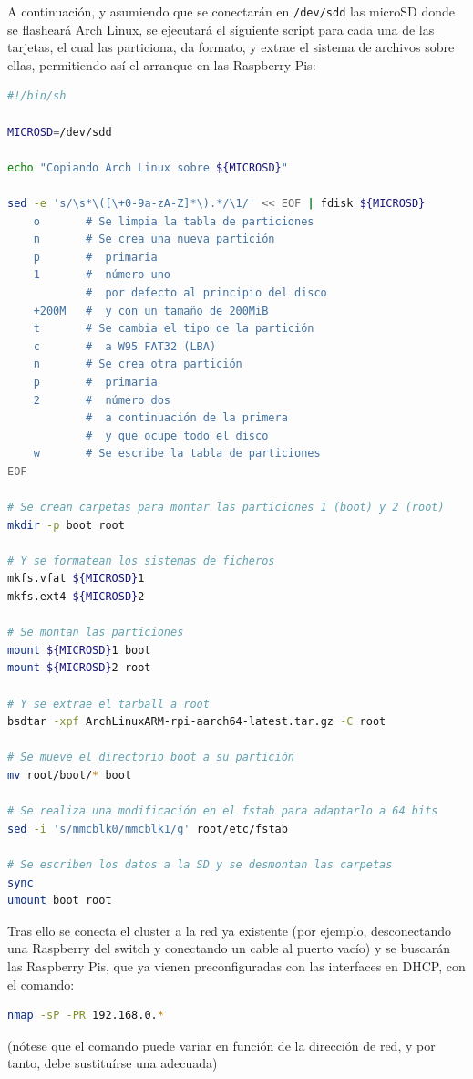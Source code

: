 A continuación, y asumiendo que se conectarán en \texttt{/dev/sdd} las microSD donde se flasheará Arch Linux, se ejecutará el siguiente script para cada una de las tarjetas, el cual las particiona, da formato, y extrae el sistema de archivos sobre ellas, permitiendo así el arranque en las Raspberry Pis:

\begin{lstlisting}[language=bash]
#!/bin/sh

MICROSD=/dev/sdd

echo "Copiando Arch Linux sobre ${MICROSD}"

sed -e 's/\s*\([\+0-9a-zA-Z]*\).*/\1/' << EOF | fdisk ${MICROSD}
    o       # Se limpia la tabla de particiones
    n       # Se crea una nueva partición
    p       #  primaria
    1       #  número uno
            #  por defecto al principio del disco
    +200M   #  y con un tamaño de 200MiB
    t       # Se cambia el tipo de la partición
    c       #  a W95 FAT32 (LBA)
    n       # Se crea otra partición
    p       #  primaria
    2       #  número dos
            #  a continuación de la primera
            #  y que ocupe todo el disco
    w       # Se escribe la tabla de particiones
EOF

# Se crean carpetas para montar las particiones 1 (boot) y 2 (root)
mkdir -p boot root

# Y se formatean los sistemas de ficheros
mkfs.vfat ${MICROSD}1
mkfs.ext4 ${MICROSD}2

# Se montan las particiones
mount ${MICROSD}1 boot
mount ${MICROSD}2 root

# Y se extrae el tarball a root
bsdtar -xpf ArchLinuxARM-rpi-aarch64-latest.tar.gz -C root

# Se mueve el directorio boot a su partición
mv root/boot/* boot

# Se realiza una modificación en el fstab para adaptarlo a 64 bits
sed -i 's/mmcblk0/mmcblk1/g' root/etc/fstab

# Se escriben los datos a la SD y se desmontan las carpetas
sync
umount boot root
\end{lstlisting}

Tras ello se conecta el cluster a la red ya existente (por ejemplo, desconectando una Raspberry del switch y conectando un cable al puerto vacío) y se buscarán las Raspberry Pis, que ya vienen preconfiguradas con las interfaces en DHCP, con el comando:

\begin{lstlisting}[language=bash]
nmap -sP -PR 192.168.0.*
\end{lstlisting}
(nótese que el comando puede variar en función de la dirección de red, y por tanto, debe sustituírse una adecuada)

